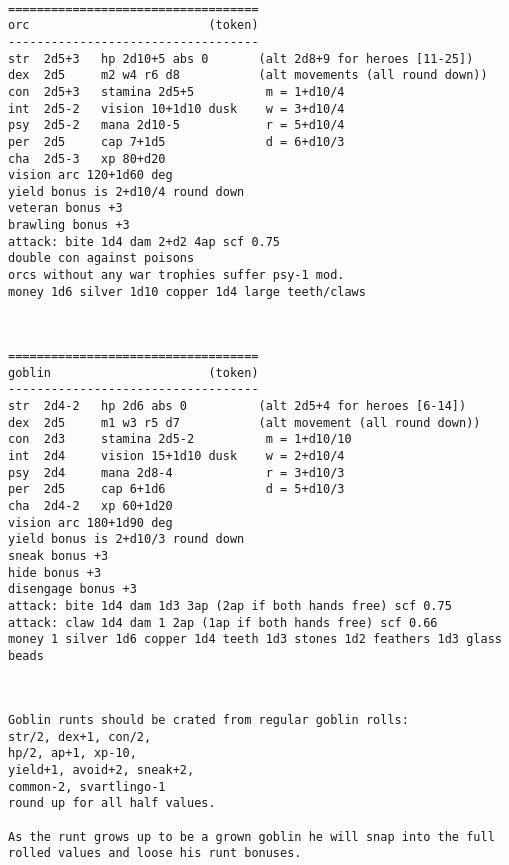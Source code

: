 \

\goodbreak \begin{samepage} \begin{verbatim}
===================================
orc                         (token)
-----------------------------------
str  2d5+3   hp 2d10+5 abs 0       (alt 2d8+9 for heroes [11-25])
dex  2d5     m2 w4 r6 d8           (alt movements (all round down))
con  2d5+3   stamina 2d5+5          m = 1+d10/4
int  2d5-2   vision 10+1d10 dusk    w = 3+d10/4
psy  2d5-2   mana 2d10-5            r = 5+d10/4
per  2d5     cap 7+1d5              d = 6+d10/3
cha  2d5-3   xp 80+d20
vision arc 120+1d60 deg
yield bonus is 2+d10/4 round down
veteran bonus +3
brawling bonus +3
attack: bite 1d4 dam 2+d2 4ap scf 0.75
double con against poisons
orcs without any war trophies suffer psy-1 mod.
money 1d6 silver 1d10 copper 1d4 large teeth/claws
\end{verbatim} \end{samepage}

\

\goodbreak \begin{samepage} \begin{verbatim}
===================================
goblin                      (token)
-----------------------------------
str  2d4-2   hp 2d6 abs 0          (alt 2d5+4 for heroes [6-14])
dex  2d5     m1 w3 r5 d7           (alt movement (all round down))
con  2d3     stamina 2d5-2          m = 1+d10/10
int  2d4     vision 15+1d10 dusk    w = 2+d10/4
psy  2d4     mana 2d8-4             r = 3+d10/3
per  2d5     cap 6+1d6              d = 5+d10/3
cha  2d4-2   xp 60+1d20
vision arc 180+1d90 deg
yield bonus is 2+d10/3 round down
sneak bonus +3
hide bonus +3
disengage bonus +3
attack: bite 1d4 dam 1d3 3ap (2ap if both hands free) scf 0.75
attack: claw 1d4 dam 1 2ap (1ap if both hands free) scf 0.66
money 1 silver 1d6 copper 1d4 teeth 1d3 stones 1d2 feathers 1d3 glass beads
\end{verbatim} \end{samepage}

\

\goodbreak \begin{samepage} \begin{verbatim}
Goblin runts should be crated from regular goblin rolls:
str/2, dex+1, con/2,
hp/2, ap+1, xp-10,
yield+1, avoid+2, sneak+2,
common-2, svartlingo-1
round up for all half values.

As the runt grows up to be a grown goblin he will snap into the full 
rolled values and loose his runt bonuses.
\end{verbatim} \end{samepage}

